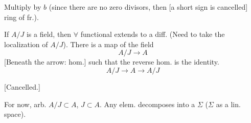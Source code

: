 \par\noindent\begin{minipage}{\linewidth}
Multiply by $b$ (since there are no zero divisors, then [a short sign is cancelled] ring of fr.).
\end{minipage}\par
If $A/J$ is a field, then $\forall$ functional extends to a diff.
(Need to take the localization of $A/J$).
There is a map of the field
\begin{equation*}
A/J\longrightarrow A
\end{equation*}
[Beneath the arrow: hom.]
such that the reverse hom. is the identity.
\begin{equation*}
A/J\longrightarrow A\longrightarrow A/J
\end{equation*}
\par\noindent\begin{minipage}{\linewidth}
[Cancelled.]
\end{minipage}\par
For now, arb.
$A/J\subset A$, $J\subset A$.
Any elem. decomposes into a $\Sigma$ ($\Sigma$ as a lin. space).

